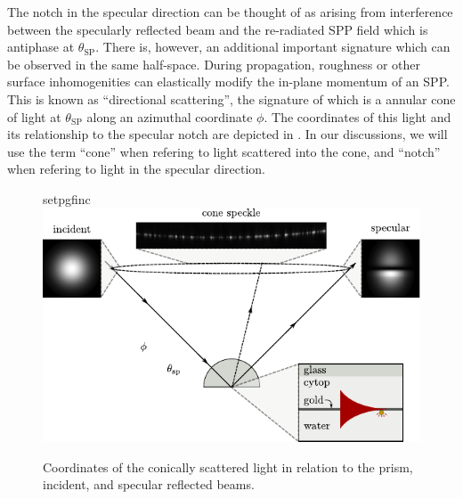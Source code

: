 The notch in the specular direction can be thought of as arising from 
interference between the specularly reflected beam and the
re-radiated SPP field which is antiphase at $\theta_\mathrm{SP}$.  There
is, however, an additional important signature which can be observed in the
same half-space.  During propagation, roughness or other surface
inhomogenities can elastically modify the in-plane momentum of an SPP.
This is known as ``directional scattering'', the signature of which is a
annular cone of light at $\theta_\mathrm{SP}$ along an azimuthal coordinate
$\phi$.  The coordinates of this light and its relationship to the specular
notch are depicted in .  In our 
discussions, we will use the term ``cone'' when refering to light scattered
into the cone, and ``notch'' when refering to light in the specular
direction.
\begin{figure}[ht]
 \centering
 {setpgfinc}
 \includegraphics{existence/figures/conefig}
 \caption{Coordinates of the conically scattered light in relation to the
 prism, incident, and specular reflected beams.}
 \label{fig:conefig}
\end{figure}

